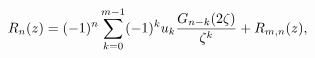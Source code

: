 \[R_{n}(z)=(-1)^{n}\sum_{k=0}^{m-1}(-1)^{k}u_{k}\frac{\mathop{G_{n-k}\/}%
\nolimits\!\left(2\zeta\right)}{\zeta^{k}}+R_{m,n}(z),\]